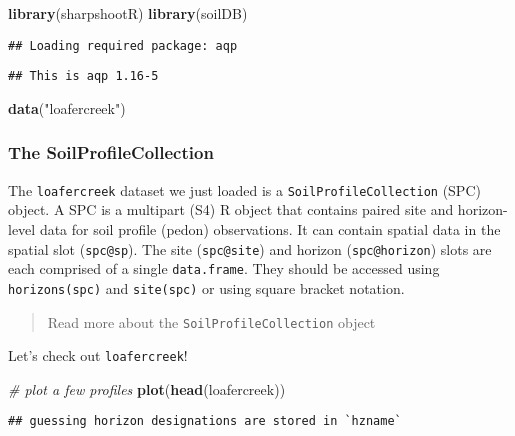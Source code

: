 \documentclass[]{article}
\newenvironment{Shaded}{\begin{snugshade}}{\end{snugshade}}
\newcommand{\KeywordTok}[1]{\textcolor[rgb]{0.13,0.29,0.53}{\textbf{#1}}}
\newcommand{\StringTok}[1]{\textcolor[rgb]{0.31,0.60,0.02}{#1}}
\newcommand{\CommentTok}[1]{\textcolor[rgb]{0.56,0.35,0.01}{\textit{#1}}}
\newcommand{\NormalTok}[1]{#1}
\begin{document}
\begin{Shaded}
\begin{Highlighting}[]
\KeywordTok{library}\NormalTok{(sharpshootR)}
\KeywordTok{library}\NormalTok{(soilDB)}
\end{Highlighting}
\end{Shaded}

\begin{verbatim}
## Loading required package: aqp
\end{verbatim}

\begin{verbatim}
## This is aqp 1.16-5
\end{verbatim}

\begin{Shaded}
\begin{Highlighting}[]
\KeywordTok{data}\NormalTok{(}\StringTok{"loafercreek"}\NormalTok{)}
\end{Highlighting}
\end{Shaded}

\subsubsection{The
SoilProfileCollection}\label{the-soilprofilecollection}

The \texttt{loafercreek} dataset we just loaded is a
\texttt{SoilProfileCollection} (SPC) object. A SPC is a multipart (S4) R
object that contains paired site and horizon-level data for soil profile
(pedon) observations. It can contain spatial data in the spatial slot
(\texttt{spc@sp}). The site (\texttt{spc@site}) and horizon
(\texttt{spc@horizon}) slots are each comprised of a single
\texttt{data.frame}. They should be accessed using
\texttt{horizons(spc)} and \texttt{site(spc)} or using square bracket
notation.

\begin{quote}
Read more about the \texttt{SoilProfileCollection} object
\end{quote}

Let's check out \texttt{loafercreek}!

\begin{Shaded}
\begin{Highlighting}[]
\CommentTok{# plot a few profiles}
\KeywordTok{plot}\NormalTok{(}\KeywordTok{head}\NormalTok{(loafercreek))}
\end{Highlighting}
\end{Shaded}

\begin{verbatim}
## guessing horizon designations are stored in `hzname`
\end{verbatim}
\end{document}
